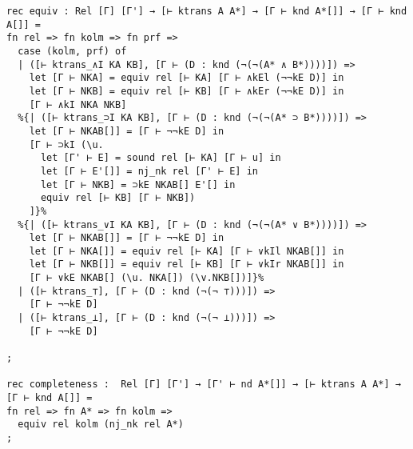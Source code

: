 \documentclass{article}
\begin{document}
\begin{lstlisting}
rec equiv : Rel [Γ] [Γ'] → [⊢ ktrans A A*] → [Γ ⊢ knd A*[]] → [Γ ⊢ knd A[]] =
fn rel => fn kolm => fn prf =>
  case (kolm, prf) of
  | ([⊢ ktrans_∧I KA KB], [Γ ⊢ (D : knd (¬(¬(A* ∧ B*))))]) =>
    let [Γ ⊢ NKA] = equiv rel [⊢ KA] [Γ ⊢ ∧kEl (¬¬kE D)] in 
    let [Γ ⊢ NKB] = equiv rel [⊢ KB] [Γ ⊢ ∧kEr (¬¬kE D)] in
    [Γ ⊢ ∧kI NKA NKB]
  %{| ([⊢ ktrans_⊃I KA KB], [Γ ⊢ (D : knd (¬(¬(A* ⊃ B*))))]) =>
    let [Γ ⊢ NKAB[]] = [Γ ⊢ ¬¬kE D] in
    [Γ ⊢ ⊃kI (\u.
      let [Γ' ⊢ E] = sound rel [⊢ KA] [Γ ⊢ u] in
      let [Γ ⊢ E'[]] = nj_nk rel [Γ' ⊢ E] in
      let [Γ ⊢ NKB] = ⊃kE NKAB[] E'[] in
      equiv rel [⊢ KB] [Γ ⊢ NKB])
    ]}%
  %{| ([⊢ ktrans_∨I KA KB], [Γ ⊢ (D : knd (¬(¬(A* ∨ B*))))]) =>
    let [Γ ⊢ NKAB[]] = [Γ ⊢ ¬¬kE D] in
    let [Γ ⊢ NKA[]] = equiv rel [⊢ KA] [Γ ⊢ ∨kIl NKAB[]] in
    let [Γ ⊢ NKB[]] = equiv rel [⊢ KB] [Γ ⊢ ∨kIr NKAB[]] in
    [Γ ⊢ ∨kE NKAB[] (\u. NKA[]) (\v.NKB[])]}%
  | ([⊢ ktrans_⊤], [Γ ⊢ (D : knd (¬(¬ ⊤)))]) =>
    [Γ ⊢ ¬¬kE D]
  | ([⊢ ktrans_⊥], [Γ ⊢ (D : knd (¬(¬ ⊥)))]) =>
    [Γ ⊢ ¬¬kE D]
    
;

rec completeness :  Rel [Γ] [Γ'] → [Γ' ⊢ nd A*[]] → [⊢ ktrans A A*] → [Γ ⊢ knd A[]] =
fn rel => fn A* => fn kolm =>
  equiv rel kolm (nj_nk rel A*)
;



\end{lstlisting}
\end{document}
